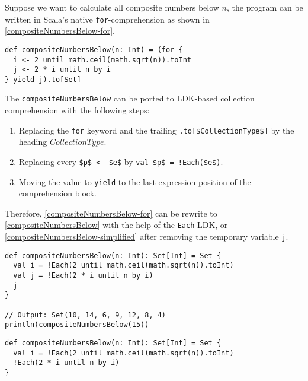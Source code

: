 Suppose we want to calculate all composite numbers below $n$, the program can be written in Scala's native \lstinline{for}-comprehension as shown in \cref{compositeNumbersBelow-for}.

\begin{lstlisting}[caption={Calculating all composite numbers below $n$ with \lstinline{for}-comprehension},label={compositeNumbersBelow-for}]
def compositeNumbersBelow(n: Int) = (for {
  i <- 2 until math.ceil(math.sqrt(n)).toInt
  j <- 2 * i until n by i
} yield j).to[Set]
\end{lstlisting}

The \lstinline{compositeNumbersBelow} can be ported to LDK-based collection comprehension with the following steps:

\begin{enumerate}
  \item Replacing the \lstinline{for} keyword and the trailing \lstinline[mathescape=true]{.to[$CollectionType$]} by the heading $CollectionType$.
  \item Replacing every \lstinline[mathescape=true]{$p$ <- $e$} by \lstinline[mathescape=true]{val $p$ = !Each($e$)}.
  \item Moving the value to \lstinline{yield} to the last expression position of the comprehension block.
\end{enumerate}

Therefore, \cref{compositeNumbersBelow-for} can be rewrite to \cref{compositeNumbersBelow} with the help of the \lstinline{Each} LDK, or \cref{compositeNumbersBelow-simplified} after removing the temporary variable \lstinline{j}.

\begin{lstlisting}[caption={Calculating all composite numbers below $n$ with \lstinline{Each} LDK},label={compositeNumbersBelow}]
def compositeNumbersBelow(n: Int): Set[Int] = Set {
  val i = !Each(2 until math.ceil(math.sqrt(n)).toInt)
  val j = !Each(2 * i until n by i)
  j
}

// Output: Set(10, 14, 6, 9, 12, 8, 4)
println(compositeNumbersBelow(15))
\end{lstlisting}


\begin{lstlisting}[caption={Calculating all composite numbers below $n$ with \lstinline{Each} LDK, the simplicied version},label={compositeNumbersBelow-simplified}]
def compositeNumbersBelow(n: Int): Set[Int] = Set {
  val i = !Each(2 until math.ceil(math.sqrt(n)).toInt)
  !Each(2 * i until n by i)
}
\end{lstlisting}

